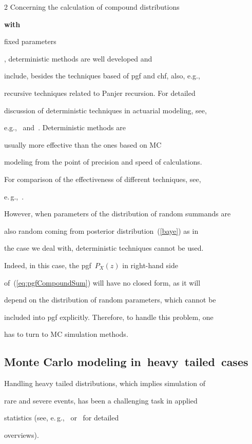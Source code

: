 \begin{multicols}{2}
Concerning the calculation of compound distributions {\bf with

fixed parameters}, deterministic methods are well developed and

include, besides the techniques based of pgf and chf, also, e.g.,

recursive techniques related to Panjer recursion. For detailed

discussion of deterministic techniques in actuarial modeling, see,

e.g.,~\cite{KPW} and~\cite{Panjer}. Deterministic methods are

usually more effective than the ones based on MC

modeling from the point of precision and speed of calculations.

For comparison of the effectiveness of different techniques, see,

e.\,g.,~\cite{TW}.



However, when parameters of the distribution of random summands are

also random coming from posterior distribution~(\ref{baye}) as in

the case we deal with, deterministic techniques cannot be used.

Indeed, in this case, the pgf~$P_X(z)$ in right-hand side

of~(\ref{eq:pgfCompoundSum}) will have no closed form, as it will

depend on the distribution of random parameters, which cannot be

included into pgf explicitly. Therefore, to handle this problem, one

has to turn to MC simulation methods.



\subsection{Monte Carlo modeling in~heavy~tailed~cases}



\noindent

Handling heavy tailed distributions, which implies simulation of

rare and severe events, has been a challenging task in applied

statistics (see, e.\,g.,~\cite{Asmus-t} or~\cite{Huang} for detailed

overviews).




\end{multicols}
